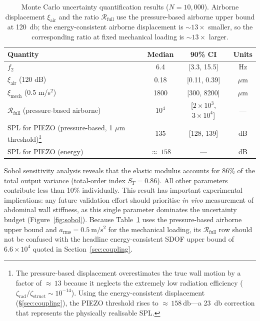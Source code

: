 \begin{table}[htbp]
  \centering
  \caption{Monte Carlo uncertainty quantification results ($N = 10{,}000$).
  Airborne displacement $\xi_\mathrm{air}$ and the ratio $\mathcal{R}_\mathrm{full}$ use the
  pressure-based airborne upper bound at \SI{120}{\decibel}; the
  energy-consistent airborne displacement is ${\sim}13\times$ smaller, so the
  corresponding ratio at fixed mechanical loading is ${\sim}13\times$ larger.}
  \label{tab:uq_summary}
  \begin{tabular}{lccc}
    \hline
    Quantity & Median & 90\% CI & Units \\
    \hline
    $f_2$ & 6.4 & [3.3, 15.5] & Hz \\
    $\xi_\mathrm{air}$ (120 dB) & 0.18 & [0.11, 0.39] & $\mu$m \\
    $\xi_\mathrm{mech}$ (0.5 m/s$^2$) & 1800 & [300, 8200] & $\mu$m \\
    $\mathcal{R}_\mathrm{full}$ (pressure-based airborne) & $10^4$ & [$2 \times 10^3$, $3 \times 10^4$] & --- \\
    SPL for PIEZO (pressure-based, 1 $\mu$m threshold)\footnote{The pressure-based displacement
      overestimates the true wall motion by a factor of ${\approx}\,13$
      because it neglects the extremely low radiation efficiency
      ($\zeta_\mathrm{rad}/\zeta_\mathrm{struct} \sim 10^{-14}$).
      Using the energy-consistent displacement
      (\S\ref{sec:coupling}), the PIEZO threshold rises to
      ${\approx}\,\SI{158}{\decibel}$---a \SI{23}{\decibel} correction
      that represents the physically realisable SPL.}
      & 135 & [128, 139] & dB \\
    SPL for PIEZO (energy) & ${\approx}\,158$ & --- & dB \\
    \hline
  \end{tabular}
\end{table}

Sobol sensitivity analysis reveals that the elastic modulus accounts for
86\% of the total output variance (total-order index $S_T = 0.86$).
All other parameters contribute less than 10\% individually.  This result
has important experimental implications: any future validation effort should
prioritise \emph{in vivo} measurement of abdominal wall stiffness, as this
single parameter dominates the uncertainty budget (Figure~\ref{fig:sobol}).
Because Table~\ref{tab:uq_summary} uses the pressure-based airborne upper bound
and $a_\mathrm{rms} = \SI{0.5}{\metre\per\second\squared}$ for the mechanical
loading, its $\mathcal{R}_\mathrm{full}$ row should not be confused with the headline
energy-consistent SDOF upper bound of $6.6 \times 10^4$ quoted in
Section~\ref{sec:coupling}.

